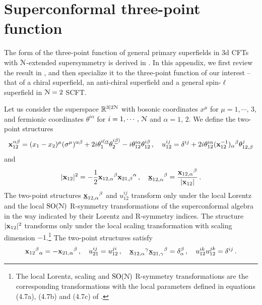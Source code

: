 \documentclass[11pt]{article}
\begin{document}
\section{Superconformal three-point function}
\label{sec:s3pt}

The form of the three-point function of general primary superfields in 3d CFTs with ${\cal N}$-extended supersymmetry is derived in \cite{Buchbinder:2015qsa}. In this appendix, we first review the result in \cite{Buchbinder:2015qsa}, and then specialize it to the three-point function of our interest -- that of a chiral superfield, an anti-chiral superfield and a general spin-$\ell$ superfield in ${\cal N}=2$ SCFT. 

Let us consider the superspace ${\mathbb R}^{3|2{\cal N}}$ with bosonic coordinates $x^\mu$ for $\mu=1,\cdots,\,3$, and fermionic coordinates $\theta^{i\alpha}$ for $i=1,\cdots,\,{\cal N}$ and $\alpha = 1,\,2$.  We define the two-point structures 
%
\begin{equation}
{\bf x}_{12}^{\alpha\beta}=(x_1-x_2)^\mu (\sigma^\mu)^{\alpha\beta}+2i\theta_1^{i(\underline{\alpha}}\theta_2^{i\underline{\beta})}-i \theta_{12}^{i\alpha}\theta_{12}^{i\beta}\,,\quad  u_{12}^{ij}=\delta^{ij}+2i\theta^{i\alpha}_{12}({\bf x}_{12}^{-1})_\alpha{}^\beta\theta^{j}_{12,\beta}
\end{equation}
%
and
%
\begin{equation}
|{\bf x}_{12}|^2=-\frac{1}{2}{\bf x}_{12,\alpha}{}^\beta {\bf x}_{21,\beta}{}^\alpha\,,\quad
\underline{{\bf x}}_{12,\alpha}{}^\beta=\frac{{\bf x}_{12,\alpha}{}^\beta}{ |{\bf x}_{12}|}\,.
\end{equation}
%
The two-point structures $\underline{{\bf x}}_{12,\alpha}{}^\beta$ and $u_{12}^{ij}$ transform only under the local Lorentz and  the local ${\rm SO}({\cal N})$ R-symmetry transformations of the superconformal algebra in the way indicated by their Lorentz and R-symmetry indices. The structure $|{\bf x}_{12}|^2$  transforms only under the local scaling transformation with scaling dimension $-1$.\footnote{The local Lorentz, scaling and ${\rm SO}({\cal N})$ R-symmetry transformations are the corresponding transformations with the local parameters defined in equations (4.7a), (4.7b) and (4.7c) of \cite{Buchbinder:2015qsa}.}
The two-point structures satisfy
%
\begin{equation}
{\bf x}_{12}{}^\beta{}_\alpha=-{\bf x}_{21,\alpha}{}^\beta\,,\quad u_{21}^{ij}=u_{12}^{ji}\,,
\quad\underline{\bf x}_{12,\alpha}{}^\gamma\underline{\bf x}_{21,\gamma}{}^\beta=\delta^\beta_\alpha\,,\quad u_{12}^{ik}u_{12}^{jk}=\delta^{ij}\,.
\end{equation}
\end{document}
